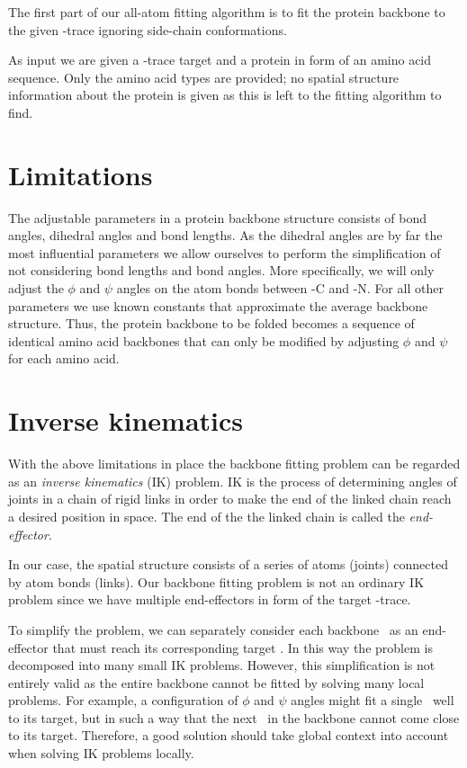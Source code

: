 The first part of our all-atom fitting algorithm is to fit the protein backbone to the given \Ca-trace ignoring side-chain conformations.

As input we are given a \Ca-trace target and a protein in form of an amino acid sequence.
Only the amino acid types are provided; no spatial structure information about the protein is given as this is left to the fitting algorithm to find.


\section{Limitations}
The adjustable parameters in a protein backbone structure consists of bond angles, dihedral angles and bond lengths.
As the dihedral angles are by far the most influential parameters we allow ourselves to perform the simplification of not considering bond lengths and bond angles.
More specifically, we will only adjust the $\phi$ and $\psi$ angles on the atom bonds between \Ca-C and \Ca-N.
For all other parameters we use known constants that approximate the average backbone structure.
Thus, the protein backbone to be folded becomes a sequence of identical amino acid backbones that can only be modified by adjusting $\phi$ and $\psi$ for each amino acid.


\section{Inverse kinematics}
With the above limitations in place the backbone fitting problem can be regarded as an \emph{inverse kinematics} (IK) problem.
IK is the process of determining angles of joints in a chain of rigid links in order to make the end of the linked chain reach a desired position in space.
The end of the the linked chain is called the \emph{end-effector}.

In our case, the spatial structure consists of a series of atoms (joints) connected by atom bonds (links).
Our backbone fitting problem is not an ordinary IK problem since we have multiple end-effectors in form of the target \Ca-trace.

To simplify the problem, we can separately consider each backbone \Ca\ as an end-effector that must reach its corresponding target \Ca.
In this way the problem is decomposed into many small IK problems.
However, this simplification is not entirely valid as the entire backbone cannot be fitted by solving many local problems.
For example, a configuration of $\phi$ and $\psi$ angles might fit a single \Ca\ well to its target, but in such a way that the next \Ca\ in the backbone cannot come close to its target.
Therefore, a good solution should take global context into account when solving IK problems locally. 

